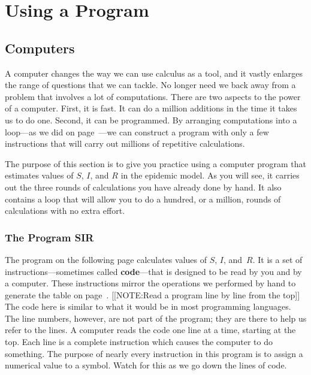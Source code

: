 \section{Using a Program}
\label{sec:using-a-program}

\subsection{Computers}
\label{subsec:computers}

A computer changes the way we can use calculus as a tool, and it
vastly enlarges the range of questions that we can tackle.  No longer
need we back away from a problem that involves a lot of computations.
There are two aspects to the power of a computer.  First, it is fast.
It can do a million additions in the time it takes us to do one.
Second, it can be programmed.  By arranging computations into a
loop---as we did on page~\pageref{`loop'}---we can construct a program
with only a few instructions that will carry out millions of
repetitive calculations.

The purpose of this section is to give you practice using a computer
program that estimates values of $S$, $I$, and $R$ in the epidemic
model.  As you will see, it carries out the three rounds of
calculations you have already done by hand.  It also contains a loop
that will allow you to do a hundred, or a million, rounds of
calculations with no extra effort.


\subsubsection{The Program SIR}
\label{subsubsec:the-program-sir}

The program on the following page calculates values of $S$, $I$,
and~$R$.  It is a set of instructions---sometimes called {\bf
  code}---that is designed to be read by you and by a
computer. These instructions mirror the operations we
performed by hand to generate the table on page~\pageref{`threeday'}.
[[NOTE:Read a program line by line from the top]] The code here is
similar to what it would be in most programming languages.  The line
numbers, however, are not part of the program; they are there to help
us refer to the lines.  A computer reads the code one line at a time,
starting at the top.  Each line is a complete instruction which causes
the computer to do something.  The purpose of nearly every instruction
in this program is to assign a numerical value to a symbol.  Watch for
this as we go down the lines of code.

